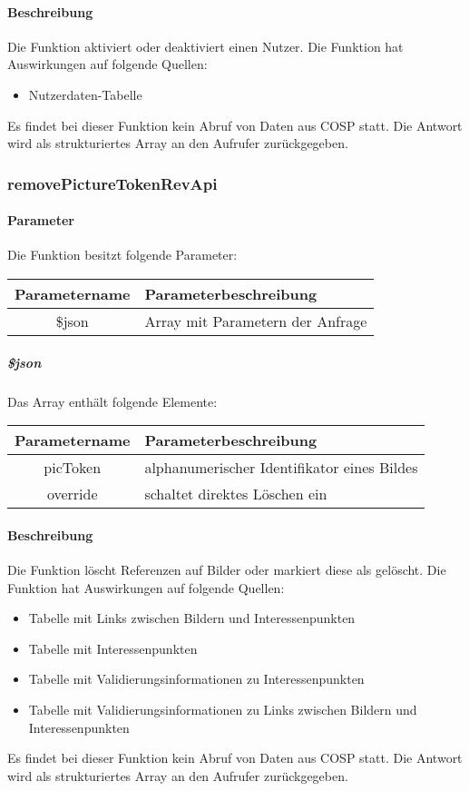 \paragraph{Beschreibung} Die Funktion aktiviert oder deaktiviert einen Nutzer. Die Funktion hat Auswirkungen auf folgende Quellen:
\begin{itemize}
	\item Nutzerdaten-Tabelle
\end{itemize}
Es findet bei dieser Funktion kein Abruf von Daten aus {\glqq COSP\grqq} statt. Die Antwort wird als strukturiertes Array an den Aufrufer zurückgegeben.
\subsubsection{removePictureTokenRevApi}
\paragraph{Parameter} Die Funktion besitzt folgende Parameter:
\begin{table}[H]
	\begin{tabular}{|c|p{11cm}|}
		\hline
		\textbf{Parametername} & \textbf{Parameterbeschreibung} \\ \hline
		\$json & Array mit Parametern der Anfrage \\ \hline
	\end{tabular}
\end{table}
\subparagraph{\$json}Das Array enthält folgende Elemente:
\begin{table}[H]
	\begin{tabular}{|c|p{11cm}|}
		\hline
		\textbf{Parametername} & \textbf{Parameterbeschreibung} \\ \hline
		picToken & alphanumerischer Identifikator eines Bildes \\ \hline
		override & schaltet direktes Löschen ein \\ \hline
	\end{tabular}
\end{table}
\paragraph{Beschreibung} Die Funktion löscht Referenzen auf Bilder oder markiert diese als gelöscht. Die Funktion hat Auswirkungen auf folgende Quellen:
\begin{itemize}
	\item Tabelle mit Links zwischen Bildern und Interessenpunkten
	\item Tabelle mit Interessenpunkten
	\item Tabelle mit Validierungsinformationen zu Interessenpunkten
	\item Tabelle mit Validierungsinformationen zu Links zwischen Bildern und Interessenpunkten
\end{itemize}
Es findet bei dieser Funktion kein Abruf von Daten aus {\glqq COSP\grqq} statt. Die Antwort wird als strukturiertes Array an den Aufrufer zurückgegeben.
